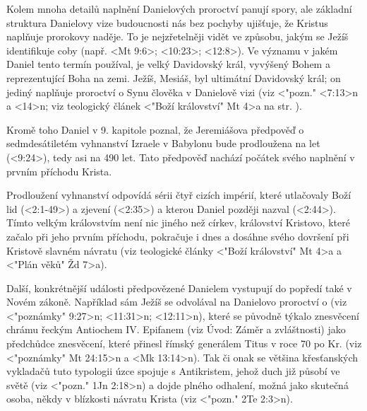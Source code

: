 Kolem mnoha detailů naplnění Danielových proroctví panují spory, ale základní
struktura Danielovy vize budoucnosti nás bez pochyby ujišťuje, že Kristus naplňuje prorokovy naděje.
To je nejzřetelněji vidět ve způsobu, jakým se Ježíš identifikuje
coby   (např. <Mt 9:6>; <10:23>; <12:8>).
Ve významu v jakém Daniel tento termín používal, je  velký Davidovský král, vyvýšený Bohem a reprezentující Boha na zemi.
Ježíš, Mesiáš, byl ultimátní Davidovský král; on jediný naplňuje proroctví o Synu člověka v Danielově vizi (viz <"pozn."  <7:13>n a <14>n;
viz teologický článek <"Boží království" Mt 4>a na str. \pg).

Kromě toho Daniel v 9. kapitole poznal, že Jeremiášova předpověď o sedmdesátiletém  vyhnanství Izraele v Babylonu
bude prodloužena na  let (<9:24>), tedy asi na 490 let.
Tato předpověď nachází počátek svého naplnění v prvním příchodu Krista.

Prodloužení vyhnanství odpovídá sérii čtyř cizích impérií, které utlačovaly Boží lid (<2:1-49>)
a zjevení  (<2:35>) a
kterou Daniel později nazval  (<2:44>).
Tímto velkým královstvím není nic jiného než církev, království Kristovo, které začalo při jeho prvním
příchodu, pokračuje i dnes a dosáhne svého dovršení při Kristově slavném návratu (viz teologické články
<"Boží království"  Mt 4>a a <"Plán věků" Žd 7>a).

Další, konkrétnější události předpovězené Danielem vystupují do popředí také v Novém zákoně.
Například sám Ježíš se odvolával na Danielovo proroctví o 
(viz <"poznámky" 9:27>n; <11:31>n; <12:11>n), které se původně týkalo znesvěcení chrámu řeckým Antiochem IV. Epifanem
(viz Úvod: Záměr a zvláštnosti) jako předchůdce znesvěcení, které přinesl římský generálem Titus v roce  70 po Kr.
(viz <"poznámky"  Mt 24:15>n a <Mk 13:14>n).
Tak či onak se většina křesťanských vykladačů tuto typologii úzce spojuje s Antikristem, jehož duch již působí ve světě
(viz <"pozn."  1Jn 2:18>n) a dojde plného odhalení, možná jako skutečná osoba, někdy v blízkosti návratu Krista
(viz <"pozn." 2Te 2:3>n).


\endinput
Chtělo by to možná něco jako \ww, ale aby bylo možné jich psát několik do stejného odstavce, byť s jinými frázemi. Nebudou se vyhledávat v textu, ale musejí přepínat mezi verzemi.
Viz např. předposlení odstavec výše, začínající slovem Prodloužení: Slovní spojení v \uv{uvozovkách} by chtěla variovat podle překladů. 


Pak za takovýmto Úvodem bude ještě muset následovat Osnova, tu zatím nemám, vydá možná na půl stránky.

